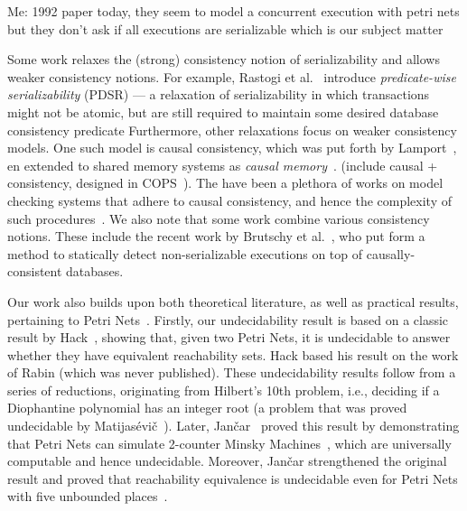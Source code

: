 
Me:
1992 paper today, they seem to model a concurrent execution with petri nets but they don't ask if all executions are serializable which is our subject matter
%

Some work relaxes the (strong) consistency notion of serializability and allows weaker consistency notions. For example, Rastogi et al.~\cite{RaMeBrKoSi93}
introduce \textit{predicate-wise serializability} (PDSR) --- a relaxation of serializability in which transactions might not be atomic, but are still required to maintain some desired database consistency predicate
%
Furthermore, other relaxations focus on weaker consistency models. One such model is causal consistency, which was put forth by Lamport~\cite{La78}, en extended to shared memory systems as \textit{causal memory}~\cite{AhNeBuKoHu95}. (include causal + consistency, designed in COPS~\cite{LlFrKaAn11}). The have been a plethora of works on model checking systems that adhere to causal consistency, and hence the complexity of such procedures~\cite{BoEnGuHa17,ZeBiBoEnEr19,LaBo20}.
%
We also note that some work combine various consistency notions. These include the recent work by Brutschy et al.~\cite{BrDiMuVe18}, who put form a method to statically detect non-serializable executions on top of
causally-consistent databases.




Our work also builds upon both theoretical literature, as well as practical results, pertaining to Petri Nets~\cite{Mu89, Es96, Reisig12}.
%
Firstly, our undecidability result is based on a classic result by Hack~\cite{Ha76, HaThesis76}, showing that, given two Petri Nets, it is undecidable to answer whether they have equivalent reachability sets. Hack based his result on the work of Rabin (which was never published). These undecidability results follow from a series of reductions, originating from Hilbert's 10th problem, i.e., deciding if a Diophantine polynomial has an integer root (a problem that was proved undecidable by Matijas{\'e}vi{\v{c}}~\cite{Ma70}).
%
Later, Jan{\v{c}}ar~\cite{Ja95} proved this result by demonstrating that Petri Nets can simulate 2-counter Minsky Machines~\cite{Mi67}, which are universally computable and hence undecidable. Moreover, Jan{\v{c}}ar strengthened the original result and proved that reachability equivalence is undecidable even for Petri Nets with five unbounded places~\cite{Ja95}.
%


